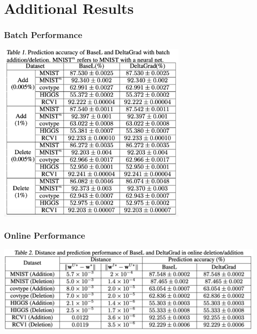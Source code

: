 \documentclass[pdf]{beamer}
\begin{document}
\section{Additional Results}
\label{additional}
\begin{frame}
  \frametitle{Batch Performance}
  \label{batch-performance}
  \begin{center}
    \includegraphics[width=0.7\textwidth]{images/Batch results.png}
  \end{center}
\end{frame}

\begin{frame}
  \frametitle{Online Performance}
  \label{Online-Performance}
  \begin{center}
    \includegraphics[width=\textwidth]{images/Online Results.png}
  \end{center}
\end{frame}
\end{document}
